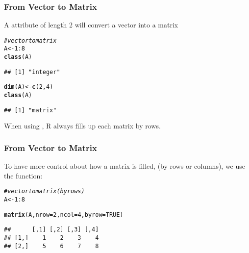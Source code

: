 \documentclass[12pt]{beamer}\usepackage[]{graphicx}\usepackage[]{color}
\makeatletter
\newcommand{\hlnum}[1]{\textcolor[rgb]{0.686,0.059,0.569}{#1}}%
\newcommand{\hlcom}[1]{\textcolor[rgb]{0.678,0.584,0.686}{\textit{#1}}}%
\newcommand{\hlopt}[1]{\textcolor[rgb]{0,0,0}{#1}}%
\newcommand{\hlstd}[1]{\textcolor[rgb]{0.345,0.345,0.345}{#1}}%
\newcommand{\hlkwb}[1]{\textcolor[rgb]{0.69,0.353,0.396}{#1}}%
\newcommand{\hlkwc}[1]{\textcolor[rgb]{0.333,0.667,0.333}{#1}}%
\newcommand{\hlkwd}[1]{\textcolor[rgb]{0.737,0.353,0.396}{\textbf{#1}}}%
\newenvironment{kframe}{%
 \def\at@end@of@kframe{}%
 \ifinner\ifhmode%
  \def\at@end@of@kframe{\end{minipage}}%
  \begin{minipage}{\columnwidth}%
 \fi\fi%
 \def\FrameCommand##1{\hskip\@totalleftmargin \hskip-\fboxsep
 \colorbox{shadecolor}{##1}\hskip-\fboxsep
     \hskip-\linewidth \hskip-\@totalleftmargin \hskip\columnwidth}%
 \MakeFramed {\advance\hsize-\width
   \@totalleftmargin\z@ \linewidth\hsize
   \@setminipage}}%
 {\par\unskip\endMakeFramed%
 \at@end@of@kframe}
\newenvironment{knitrout}{}{} %
\makeatother
\begin{document}
\begin{frame}[fragile]
\frametitle{From Vector to Matrix}

A  attribute of length 2 will convert a vector into a matrix
\begin{knitrout}\footnotesize
{}\color{fgcolor}\begin{kframe}
\begin{alltt}
\hlcom{# vector to matrix}
\hlstd{A} \hlkwb{<-} \hlnum{1}\hlopt{:}\hlnum{8}
\hlkwd{class}\hlstd{(A)}
\end{alltt}
\begin{verbatim}
## [1] "integer"
\end{verbatim}
\begin{alltt}
\hlkwd{dim}\hlstd{(A)} \hlkwb{<-} \hlkwd{c}\hlstd{(}\hlnum{2}\hlstd{,} \hlnum{4}\hlstd{)}
\hlkwd{class}\hlstd{(A)}
\end{alltt}
\begin{verbatim}
## [1] "matrix"
\end{verbatim}
\end{kframe}
\end{knitrout}

When using , R always fills up each matrix by rows.

\end{frame}


\begin{frame}[fragile]
\frametitle{From Vector to Matrix}

To have more control about how a matrix is filled, (by rows or columns), we use the  function:
\begin{knitrout}\footnotesize
{}\color{fgcolor}\begin{kframe}
\begin{alltt}
\hlcom{# vector to matrix (by rows)}
\hlstd{A} \hlkwb{<-} \hlnum{1}\hlopt{:}\hlnum{8}

\hlkwd{matrix}\hlstd{(A,} \hlkwc{nrow} \hlstd{=} \hlnum{2}\hlstd{,} \hlkwc{ncol} \hlstd{=} \hlnum{4}\hlstd{,} \hlkwc{byrow} \hlstd{=} \hlnum{TRUE}\hlstd{)}
\end{alltt}
\begin{verbatim}
##      [,1] [,2] [,3] [,4]
## [1,]    1    2    3    4
## [2,]    5    6    7    8
\end{verbatim}
\end{kframe}
\end{knitrout}

\end{frame}
\end{document}
